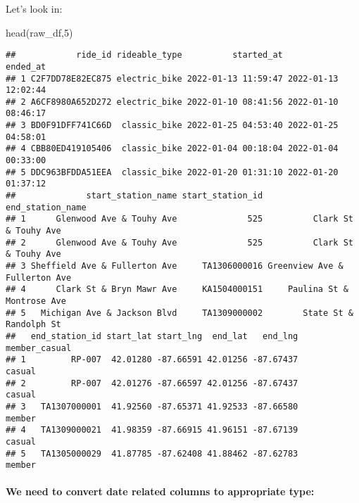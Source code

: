 \documentclass[
]{article}
\newenvironment{Shaded}{\begin{snugshade}}{\end{snugshade}}
\newcommand{\DecValTok}[1]{\textcolor[rgb]{0.00,0.00,0.81}{#1}}
\newcommand{\FunctionTok}[1]{\textcolor[rgb]{0.00,0.00,0.00}{#1}}
\newcommand{\NormalTok}[1]{#1}
\newcommand{\OtherTok}[1]{\textcolor[rgb]{0.56,0.35,0.01}{#1}}
\newcommand{\SpecialCharTok}[1]{\textcolor[rgb]{0.00,0.00,0.00}{#1}}
\begin{document}
Let's look in:

\begin{Shaded}
\begin{Highlighting}[]
\FunctionTok{head}\NormalTok{(raw\_df,}\DecValTok{5}\NormalTok{)}
\end{Highlighting}
\end{Shaded}

\begin{verbatim}
##            ride_id rideable_type          started_at            ended_at
## 1 C2F7DD78E82EC875 electric_bike 2022-01-13 11:59:47 2022-01-13 12:02:44
## 2 A6CF8980A652D272 electric_bike 2022-01-10 08:41:56 2022-01-10 08:46:17
## 3 BD0F91DFF741C66D  classic_bike 2022-01-25 04:53:40 2022-01-25 04:58:01
## 4 CBB80ED419105406  classic_bike 2022-01-04 00:18:04 2022-01-04 00:33:00
## 5 DDC963BFDDA51EEA  classic_bike 2022-01-20 01:31:10 2022-01-20 01:37:12
##              start_station_name start_station_id              end_station_name
## 1      Glenwood Ave & Touhy Ave              525          Clark St & Touhy Ave
## 2      Glenwood Ave & Touhy Ave              525          Clark St & Touhy Ave
## 3 Sheffield Ave & Fullerton Ave     TA1306000016 Greenview Ave & Fullerton Ave
## 4      Clark St & Bryn Mawr Ave     KA1504000151     Paulina St & Montrose Ave
## 5   Michigan Ave & Jackson Blvd     TA1309000002        State St & Randolph St
##   end_station_id start_lat start_lng  end_lat   end_lng member_casual
## 1         RP-007  42.01280 -87.66591 42.01256 -87.67437        casual
## 2         RP-007  42.01276 -87.66597 42.01256 -87.67437        casual
## 3   TA1307000001  41.92560 -87.65371 41.92533 -87.66580        member
## 4   TA1309000021  41.98359 -87.66915 41.96151 -87.67139        casual
## 5   TA1305000029  41.87785 -87.62408 41.88462 -87.62783        member
\end{verbatim}

\hypertarget{we-need-to-convert-date-related-columns-to-appropriate-type}{%
\paragraph{We need to convert date related columns to appropriate
type:}\label{we-need-to-convert-date-related-columns-to-appropriate-type}}

\begin{Shaded}
\end{Shaded}
\end{document}
